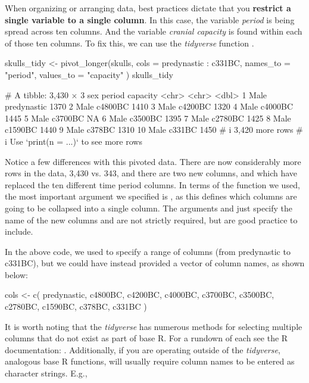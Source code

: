 When organizing or arranging data, best practices dictate that you \textbf{restrict a single variable to a single column}. In this case, the variable \textit{period} is being spread across ten columns. And the variable \textit{cranial capacity} is found within each of those ten columns. To fix this, we can use the \textit{tidyverse} function .

\begin{inR}
skulls_tidy <- pivot_longer(skulls,
  cols = predynastic : c331BC,
  names_to = "period",
  values_to = "capacity"
)
skulls_tidy
\end{inR}
\begin{outR}
# A tibble: 3,430 × 3
   sex   period      capacity
   <chr> <chr>          <dbl>
 1 Male  predynastic     1370
 2 Male  c4800BC         1410
 3 Male  c4200BC         1320
 4 Male  c4000BC         1445
 5 Male  c3700BC           NA
 6 Male  c3500BC         1395
 7 Male  c2780BC         1425
 8 Male  c1590BC         1440
 9 Male  c378BC          1310
10 Male  c331BC          1450
# i 3,420 more rows
# i Use `print(n = ...)` to see more rows
\end{outR}

Notice a few differences with this pivoted data. There are now considerably more rows in the data, 3,430 vs. 343, and there are two new columns,  and  which have replaced the ten different time period columns. In terms of the  function we used, the most important argument we specified is , as this defines which columns are going to be collapsed into a single column. The arguments  and  just specify the name of the new columns and are not strictly required, but are good practice to include.

In the above code, we used \R{:} to specify a range of columns (from predynastic to c331BC), but we could have instead provided a vector of column names, as shown below:

\begin{inR}
cols <- c(
  predynastic, c4800BC, c4200BC, c4000BC, c3700BC,
  c3500BC, c2780BC, c1590BC, c378BC, c331BC
)
\end{inR}
\vspace{1em}

\noindent It is worth noting that the \textit{tidyverse} has numerous methods for selecting multiple columns that do not exist as part of base R. For a rundown of each see the R documentation: . Additionally, if you are operating outside of the \textit{tidyverse}, analogous base R functions, will usually require column names to be entered as character strings. E.g.,


